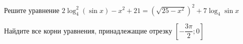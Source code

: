 \begin{ex}
	\begin{condition}
		\begin{enumcols}[label=\asbuk*)]
			\item Решите уравнение \( 2\log_4^2(\sin x) -x^2 + 21 = \left(\sqrt{25 -x^2}\right)^2 + 7\log_4 \sin x \)
			\item Найдите все корни уравнения, принадлежащие отрезку \( \left[-\dfrac{3\pi}{2};0\right] \)
		\end{enumcols}
	\end{condition}
\end{ex}